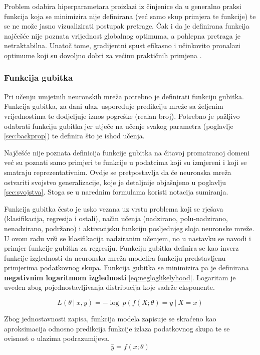 \documentclass[times, utf8, numeric, diplomski]{fer}
\def\probsep{\ |\ }
\def\secref#1{(poglavlje \ref{#1})}
\begin{document}
Problem odabira hiperparametara proizlazi iz činjenice da u generalno praksi funkcija koja se minimizira nije definirana (već samo skup primjera te funkcije) te se ne može jasno vizualizirati postupak pretrage. Čak i da je definirana funkcija najčešće nije poznata vrijednost globalnog optimuma, a pohlepna pretraga je netraktabilna. Unatoč tome, gradijentni spust efikasno i učinkovito pronalazi optimume koji su dovoljno dobri za većinu praktičnih primjena \citep{yolo}.

\subsubsection{Funkcija gubitka}
Pri učenju umjetnih neuronskih mreža potrebno je definirati funkciju gubitka. Funkcija gubitka, za dani ulaz, uspoređuje predikciju mreže sa željenim vrijednostima te dodjeljuje iznos pogreške (realan broj). Potrebno je pažljivo odabrati funkciju gubitka jer utječe na učenje svakog parametra \secref{sec:backprop} te definira što je ishod učenja. 

Najčešće nije poznata definicija funkcije gubitka na čitavoj promatranoj domeni već su poznati samo primjeri te funkcije u podatcima koji su izmjereni i koji se smatraju reprezentativnim. Ovdje se pretpostavlja da će neuronska mreža ostvariti svojstvo generalizacije, koje je detaljnije objašnjeno u poglavlju \ref{sec:svojstva}. Stoga se u narednim formulama koristi notacija sumiranja.

Funkcija gubitka često je usko vezana uz vrstu problema koji se rješava (klasifikacija, regresija i ostali), način učenja (nadzirano, polu-nadzirano, nenadzirano, podržano) i aktivacijsku funkciju posljednjeg sloja neuronske mreže. U ovom radu vrši se klasifikacija nadziranim učenjem, no u nastavku se navodi i primjer funkcije gubitka za regresiju. Funkciju gubitka definira se kao inverz funkcije izglednosti da neuronska mreža modelira funkciju predstavljenu primjerima podatkovnog skupa. Funkcija gubitka se minimizira pa je definirana \textbf{negativnim logaritmom izglednosti} \eqref{eq:negloglikelyhood}. Logaritam je uveden zbog pojednostavljivanja distribucija koje sadrže eksponente.

\begin{equation}
\label{eq:negloglikelyhood}
L(\theta \probsep x,y) = -\log\ p(f(X;\theta)=y \probsep X=x)
\end{equation}

Zbog jednostavnosti zapisa, funkcija modela zapisuje se skraćeno kao aproksimacija odnosno predikcija funkcije izlaza podatkovnog skupa te se ovisnost o ulazima podrazumijeva.
\begin{equation}
\hat{y} = f(x; \theta)
\end{equation}
\end{document}
